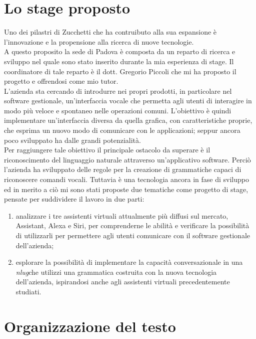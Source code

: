 \section{Lo stage proposto}
Uno dei pilastri di Zucchetti che ha contruibuto alla sua espansione è l'innovazione e la propensione alla ricerca di nuove tecnologie. \\
A questo proposito la sede di Padova è composta da un reparto di ricerca e sviluppo nel quale sono stato inserito durante la mia esperienza di stage. Il coordinatore di tale reparto è il dott. Gregorio Piccoli che mi ha proposto il progetto e offrendosi come mio tutor. \\
L'azienda sta cercando di introdurre nei propri prodotti, in particolare nel software gestionale, un'interfaccia vocale che permetta agli utenti di interagire in modo più veloce e spontaneo nelle operazioni comuni. L'obiettivo è quindi implementare un'interfaccia diversa da quella grafica, con caratteristiche proprie, che esprima un nuovo modo di comunicare con le applicazioni; seppur ancora poco sviluppato ha dalle grandi potenzialità. \\
Per raggiungere tale obiettivo il principale ostacolo da superare è il riconoscimento del linguaggio naturale attraverso un'applicativo software. Perciò l'azienda ha sviluppato delle regole per la creazione di grammatiche capaci di riconoscere comandi vocali. Tuttavia è una tecnologia ancora in fase di sviluppo ed in merito a ciò mi sono stati proposte due tematiche come progetto di stage, pensate per suddividere il lavoro in due parti:
\begin{enumerate}
	\item analizzare i tre assistenti virtuali attualmente più diffusi sul mercato, Assistant, Alexa e Siri, per comprenderne le abilità e verificare la possibilità di utilizzarli per permettere agli utenti comunicare con il software gestionale dell'azienda;
	\item esplorare la possibilità di implementare la capacità conversazionale in una \emph{\gls{nlug}}\glsfirstoccur che utilizzi una grammatica costruita con la nuova tecnologia dell'azienda, ispirandosi anche agli assistenti virtuali precedentemente studiati.
\end{enumerate}

\section{Organizzazione del testo}


